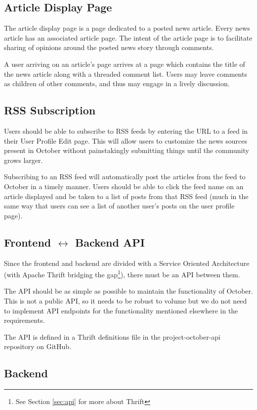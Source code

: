 \documentclass[11pt,letterpaper,titlepage]{article}
\begin{document}
\subsection{Article Display Page}
The article display page is a page dedicated to a posted news article. Every news article has an associated article page.
The intent of the article page is to facilitate sharing of opinions around the posted news story through comments.

A user arriving on an article's page arrives at a page which contains the title of the news article along with a threaded comment list.
Users may leave comments as children of other comments, and thus may engage in a lively discussion.

\subsection{RSS Subscription}
\label{sec:rssrequirements}
Users should be able to subscribe to RSS feeds by entering the URL to a feed in their User Profile Edit page.
This will allow users to customize the news sources present in October without painstakingly submitting things until the community grows larger.

Subscribing to an RSS feed will automatically post the articles from the feed to October in a timely manner.
Users should be able to click the feed name on an article displayed and be taken to a list of posts from that RSS feed (much in the same way that users can see a list of another user's posts on the user profile page).

\subsection{Frontend $\leftrightarrow$ Backend API}
Since the frontend and backend are divided with a Service Oriented Architecture (with Apache Thrift bridging the gap\footnote{See Section \ref{sec:api} for more about Thrift}), there must be an API between them.

The API should be as simple as possible to maintain the functionality of October. This is not a public API, so it needs to be robust to volume but we do not need to implement API endpoints for the functionality mentioned elsewhere in the requirements.

The API is defined in a Thrift definitions file in the project-october-api repository on GitHub\cite{project-october-api}.

\subsection{Backend} %
\end{document}
